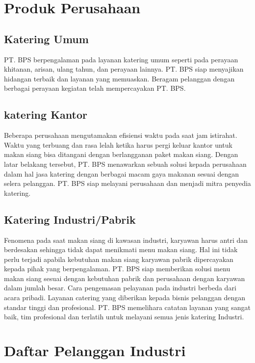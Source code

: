 \section{Produk Perusahaan}

\subsection{Katering Umum}

PT. BPS berpengalaman pada layanan katering umum seperti pada perayaan khitanan, 
arisan, ulang tahun, dan perayaan lainnya. PT. BPS siap menyajikan hidangan terbaik dan layanan yang memuaskan. 
Beragam pelanggan dengan berbagai perayaan kegiatan telah mempercayakan PT. BPS.

\subsection{katering Kantor}
Beberapa perusahaan mengutamakan efisiensi waktu pada saat jam istirahat. 
Waktu yang terbuang dan rasa lelah ketika harus pergi keluar kantor untuk makan 
siang bisa ditangani dengan berlangganan paket makan siang. Dengan latar belakang tersebut, 
PT. BPS menawarkan sebuah solusi kepada perusahaan dalam hal jasa katering dengan berbagai 
macam gaya makanan sesuai dengan selera pelanggan. 
PT. BPS siap melayani perusahaan dan menjadi mitra penyedia katering.

\subsection{Katering Industri/Pabrik}
Fenomena pada saat makan siang di kawasan industri, karyawan harus antri dan berdesakan sehingga 
tidak dapat menikmati menu makan siang. Hal ini tidak perlu terjadi apabila kebutuhan makan siang 
karyawan pabrik dipercayakan kepada pihak yang berpengalaman. PT. BPS siap memberikan solusi menu makan 
siang sesuai dengan kebutuhan pabrik dan perusahaan dengan karyawan dalam jumlah besar. 
Cara pengemasan pelayanan pada industri berbeda dari acara pribadi.  
Layanan catering yang diberikan kepada bisnis pelanggan dengan standar tinggi dan profesional. 
PT. BPS memelihara catatan layanan yang sangat baik, 
tim profesional dan terlatih untuk melayani semua jenis katering Industri.

\section{Daftar Pelanggan Industri}

